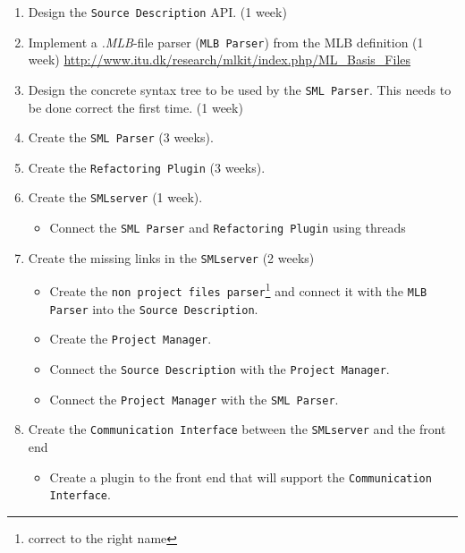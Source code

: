 \documentclass[a4paper,oneside]{memoir}
\begin{document}
\begin{enumerate}
\item Design the \texttt{Source Description} API. (1 week)

\item Implement a \textit{.MLB}-file parser (\texttt{MLB Parser}) from the MLB
  definition (1 week) 
\url{http://www.itu.dk/research/mlkit/index.php/ML_Basis_Files}

\item Design the concrete syntax tree to be used by the \texttt{SML
    Parser}. This needs to be done correct the first time. (1 week)

\item Create the \texttt{SML Parser} (3 weeks).

\item Create the \texttt{Refactoring Plugin} (3 weeks).

\item Create the \texttt{SMLserver} (1 week).
  \begin{itemize}
  \item Connect the \texttt{SML Parser} and \texttt{Refactoring Plugin} using threads
  \end{itemize}

\item Create the missing links in the \texttt{SMLserver} (2 weeks)
  \begin{itemize}
  \item Create the \texttt{non project files parser}\footnote{correct to the
      right name} and connect it with the \texttt{MLB Parser} into the
    \texttt{Source Description}.

  \item Create the \texttt{Project Manager}.

  \item Connect the \texttt{Source Description} with the \texttt{Project
      Manager}.

  \item Connect the \texttt{Project Manager} with the \texttt{SML Parser}.
  \end{itemize}

\item Create the \texttt{Communication Interface} between the \texttt{SMLserver}
  and the front end
  \begin{itemize}
  \item Create a plugin to the front end that will support the
    \texttt{Communication Interface}.
  \end{itemize}
\end{enumerate}
\end{document}
